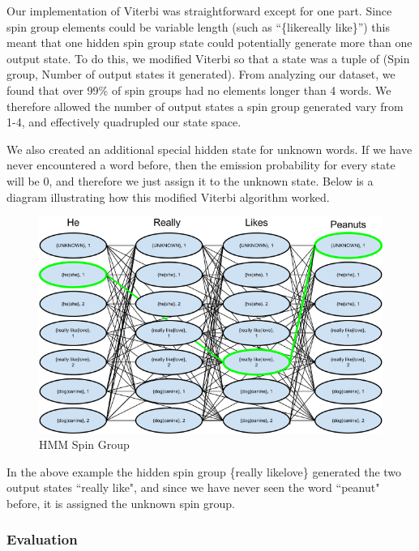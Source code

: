 \documentclass[11pt,letterpaper,oneside, titlepage]{scrartcl}
\begin{document}
Our implementation of Viterbi was straightforward except for one part. Since spin group elements could be variable length (such as ``\{like\textbar really like\}”) this meant that one hidden spin group state could potentially generate more than one output state. To do this, we modified Viterbi so that a state was a tuple of (Spin group, Number of output states it generated). From analyzing our dataset, we found that over 99\% of spin groups had no elements longer than 4 words. We therefore allowed the number of output states a spin group generated vary from 1-4, and effectively quadrupled our state space. 

We also created an additional special hidden state for unknown words. If we have never encountered a word before, then the emission probability for every state will be 0, and therefore we just assign it to the unknown state. Below is a diagram illustrating how this modified Viterbi algorithm worked.

\begin{figure}[h!]
  \centering
  \includegraphics[width=.8\textwidth]{hmm_spin_group}
  \caption{HMM Spin Group}
  \label{fig:hmm_spin_group}
\end{figure}


In the above example the hidden spin group \{really like\textbar love\} generated the two output states ``really like", and since we have never seen the word ``peanut" before, it is assigned the unknown spin group.

\subsubsection{Evaluation}
\end{document}
